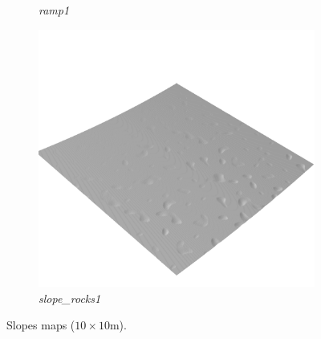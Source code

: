 \documentclass[../document.tex]{subfiles}
\begin{document}
\begin{figure}[H]
\begin{subfigure}[b]{0.32\linewidth}
            \caption{\emph{ramp1}}
            \end{subfigure}    
          \begin{subfigure}[b]{0.32\textwidth}
            \includegraphics[width=\textwidth]{../img/hm3d/slope_rocks1.png}
            \caption{\emph{slope\_rocks1}}
        \end{subfigure}    
    \caption{Slopes maps ($10\times10$m).}
\end{figure}
\end{document}
